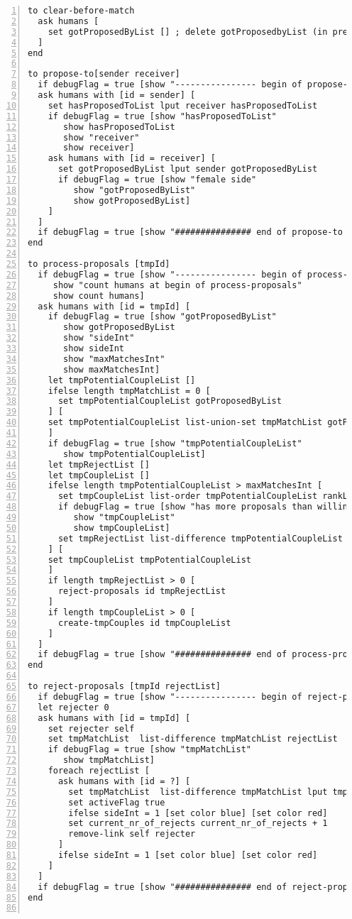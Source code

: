 \begin{lstlisting}[numbers=left, breaklines=true]
to clear-before-match
  ask humans [
    set gotProposedByList [] ; delete gotProposedbyList (in preparation for next matching-round)
  ]
end

to propose-to[sender receiver]
  if debugFlag = true [show "---------------- begin of propose-to ----------------"]
  ask humans with [id = sender] [
    set hasProposedToList lput receiver hasProposedToList
    if debugFlag = true [show "hasProposedToList"
       show hasProposedToList
       show "receiver"
       show receiver]
    ask humans with [id = receiver] [
      set gotProposedByList lput sender gotProposedByList
      if debugFlag = true [show "female side"
         show "gotProposedByList"
         show gotProposedByList]
    ]
  ]
  if debugFlag = true [show "############### end of propose-to ###############"]
end

to process-proposals [tmpId]
  if debugFlag = true [show "---------------- begin of process-proposals ----------------"
     show "count humans at begin of process-proposals"
     show count humans]
  ask humans with [id = tmpId] [
    if debugFlag = true [show "gotProposedByList"
       show gotProposedByList
       show "sideInt"
       show sideInt
       show "maxMatchesInt"
       show maxMatchesInt]
    let tmpPotentialCoupleList []
    ifelse length tmpMatchList = 0 [
      set tmpPotentialCoupleList gotProposedByList
    ] [
    set tmpPotentialCoupleList list-union-set tmpMatchList gotProposedByList
    ]
    if debugFlag = true [show "tmpPotentialCoupleList"
       show tmpPotentialCoupleList]
    let tmpRejectList []
    let tmpCoupleList []
    ifelse length tmpPotentialCoupleList > maxMatchesInt [
      set tmpCoupleList list-order tmpPotentialCoupleList rankList partnerList maxMatchesInt
      if debugFlag = true [show "has more proposals than willing to accept"
         show "tmpCoupleList"
         show tmpCoupleList]
      set tmpRejectList list-difference tmpPotentialCoupleList tmpCoupleList
    ] [
    set tmpCoupleList tmpPotentialCoupleList
    ]
    if length tmpRejectList > 0 [
      reject-proposals id tmpRejectList
    ]
    if length tmpCoupleList > 0 [
      create-tmpCouples id tmpCoupleList
    ]
  ]
  if debugFlag = true [show "############### end of process-proposals ###############"]
end

to reject-proposals [tmpId rejectList]
  if debugFlag = true [show "---------------- begin of reject-proposals ----------------"]
  let rejecter 0
  ask humans with [id = tmpId] [
    set rejecter self
    set tmpMatchList  list-difference tmpMatchList rejectList
    if debugFlag = true [show "tmpMatchList"
       show tmpMatchList]
    foreach rejectList [
      ask humans with [id = ?] [
        set tmpMatchList  list-difference tmpMatchList lput tmpId []
        set activeFlag true
        ifelse sideInt = 1 [set color blue] [set color red]
        set current_nr_of_rejects current_nr_of_rejects + 1
        remove-link self rejecter
      ]
      ifelse sideInt = 1 [set color blue] [set color red]
    ]
  ]
  if debugFlag = true [show "############### end of reject-proposals ###############"]
end


\end{lstlisting}
